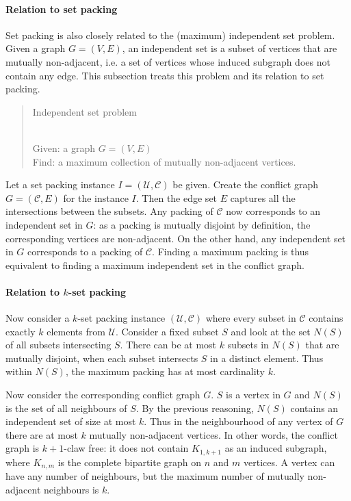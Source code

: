 \paragraph{Relation to set packing} Set packing is also closely related to the (maximum) independent set problem. Given a graph $G = (V,E)$, an independent set is a subset of vertices that are mutually non-adjacent, i.e. a set of vertices whose induced subgraph does not contain any edge. This subsection treats this problem and its relation to set packing.
%
\begin{quote}
\begin{bf}Independent set problem\end{bf}\\
Given: a graph $G = (V,E)$ \\
Find: a maximum collection of mutually non-adjacent vertices.
\end{quote}
%
Let a set packing instance $I = (\mathcal{U},\mathcal{C})$ be given. Create the conflict graph $G = (\mathcal{C},E)$ %
for the instance $I$. Then the edge set $E$ captures all the intersections between the subsets. Any packing of $\mathcal{C}$ now corresponds to an independent set in $G$: as a packing is mutually disjoint by definition, the corresponding vertices are non-adjacent. On the other hand, any independent set in $G$ corresponds to a packing of $\mathcal{C}$. Finding a maximum packing is thus equivalent to finding a maximum independent set in the conflict graph.

\paragraph{Relation to $k$-set packing} Now consider a $k$-set packing instance $(\mathcal{U}, \mathcal{C})$ where every subset in $\mathcal{C}$ contains exactly $k$ elements from $\mathcal{U}$. Consider a fixed subset $S$ and look at the set $N(S)$ of all subsets intersecting $S$. There can be at most $k$ subsets in $N(S)$ that are mutually disjoint, when each subset intersects $S$ in a distinct element. Thus within $N(S)$, the maximum packing has at most cardinality $k$.

Now consider the corresponding conflict graph $G$. $S$ is a vertex in $G$ and $N(S)$ is the set of all neighbours of $S$. By the previous reasoning, $N(S)$ contains an independent set of size at most $k$. Thus in the neighbourhood of any vertex of $G$ there are at most $k$ mutually non-adjacent vertices. In other words, the conflict graph is $k+1$-claw free: it does not contain $K_{1,k+1}$ as an induced subgraph, where $K_{n,m}$ is the complete bipartite graph on $n$ and $m$ vertices. A vertex can have any number of neighbours, but the maximum number of mutually non-adjacent neighbours is $k$. %

